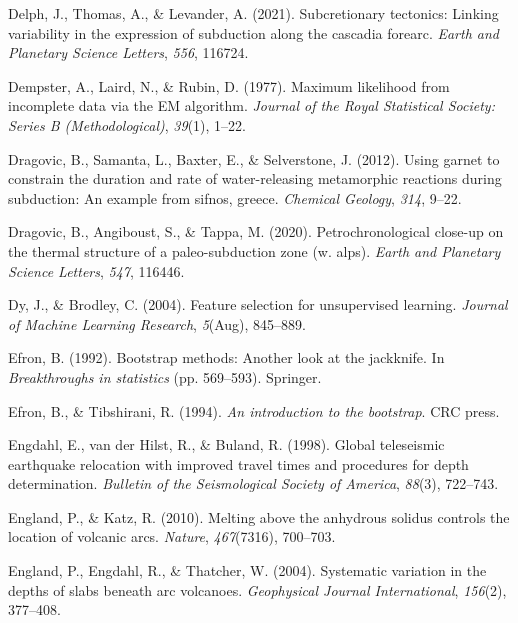 \begin{CSLReferences}{1}{1}
\leavevmode{}%
Delph, J., Thomas, A., \& Levander, A. (2021). Subcretionary tectonics: Linking variability in the expression of subduction along the cascadia forearc. \emph{Earth and Planetary Science Letters}, \emph{556}, 116724.

\leavevmode{}%
Dempster, A., Laird, N., \& Rubin, D. (1977). Maximum likelihood from incomplete data via the EM algorithm. \emph{Journal of the Royal Statistical Society: Series B (Methodological)}, \emph{39}(1), 1--22.

\leavevmode{}%
Dragovic, B., Samanta, L., Baxter, E., \& Selverstone, J. (2012). Using garnet to constrain the duration and rate of water-releasing metamorphic reactions during subduction: An example from sifnos, greece. \emph{Chemical Geology}, \emph{314}, 9--22.

\leavevmode{}%
Dragovic, B., Angiboust, S., \& Tappa, M. (2020). Petrochronological close-up on the thermal structure of a paleo-subduction zone (w. alps). \emph{Earth and Planetary Science Letters}, \emph{547}, 116446.

\leavevmode{}%
Dy, J., \& Brodley, C. (2004). Feature selection for unsupervised learning. \emph{Journal of Machine Learning Research}, \emph{5}(Aug), 845--889.

\leavevmode{}%
Efron, B. (1992). Bootstrap methods: Another look at the jackknife. In \emph{Breakthroughs in statistics} (pp. 569--593). Springer.

\leavevmode{}%
Efron, B., \& Tibshirani, R. (1994). \emph{An introduction to the bootstrap}. CRC press.

\leavevmode{}%
Engdahl, E., van der Hilst, R., \& Buland, R. (1998). Global teleseismic earthquake relocation with improved travel times and procedures for depth determination. \emph{Bulletin of the Seismological Society of America}, \emph{88}(3), 722--743.

\leavevmode{}%
England, P., \& Katz, R. (2010). Melting above the anhydrous solidus controls the location of volcanic arcs. \emph{Nature}, \emph{467}(7316), 700--703.

\leavevmode{}%
England, P., Engdahl, R., \& Thatcher, W. (2004). Systematic variation in the depths of slabs beneath arc volcanoes. \emph{Geophysical Journal International}, \emph{156}(2), 377--408.


\end{CSLReferences}
